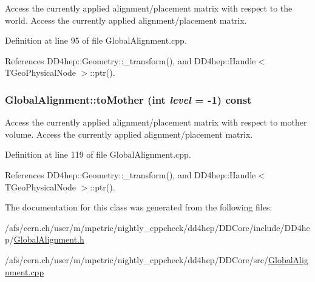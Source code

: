 Access the currently applied alignment/placement matrix with respect to the world. Access the currently applied alignment/placement matrix. 

Definition at line 95 of file GlobalAlignment.cpp.

References DD4hep::Geometry::\_\-transform(), and DD4hep::Handle$<$ TGeoPhysicalNode $>$::ptr().\hypertarget{class_d_d4hep_1_1_alignments_1_1_global_alignment_ab1d4442ce582827d0db9680ce7dc5b4b}{
\subsubsection[{toMother}]{ GlobalAlignment::toMother (int {\em level} = {\ttfamily -\/1}) const}}
\label{class_d_d4hep_1_1_alignments_1_1_global_alignment_ab1d4442ce582827d0db9680ce7dc5b4b}


Access the currently applied alignment/placement matrix with respect to mother volume. Access the currently applied alignment/placement matrix. 

Definition at line 119 of file GlobalAlignment.cpp.

References DD4hep::Geometry::\_\-transform(), and DD4hep::Handle$<$ TGeoPhysicalNode $>$::ptr().

The documentation for this class was generated from the following files:\begin{DoxyCompactItemize}
\item 
/afs/cern.ch/user/m/mpetric/nightly\_\-cppcheck/dd4hep/DDCore/include/DD4hep/\hyperlink{_global_alignment_8h}{GlobalAlignment.h}\item 
/afs/cern.ch/user/m/mpetric/nightly\_\-cppcheck/dd4hep/DDCore/src/\hyperlink{_global_alignment_8cpp}{GlobalAlignment.cpp}\end{DoxyCompactItemize}
